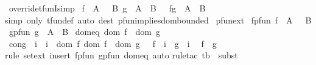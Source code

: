 \begin{isabellebody}
%
\endisadelimproof
\isanewline
{}\isamarkupfalse%
\ override{\isacharunderscore}tfunI{}{\isacharbrackleft}simp{\isacharbrackright}{\isacharcolon}\isanewline
{\isachardoublequoteopen}{\isasymlbrakk}\ f\ {\isacharcolon}\ A\ {\isacharminus}{\isacharbar}{\isacharminus}{\isachargreater}\ \ B{\isacharsemicolon}\ g\ {\isacharcolon}\ A\ {\isacharminus}{\isacharminus}{\isacharminus}{\isachargreater}\ B\ {\isasymrbrakk}\ {\isasymLongrightarrow}\ f{\isacharparenleft}{\isacharplus}{\isacharparenright}g\ {\isacharcolon}\ A\ {\isacharminus}{\isacharminus}{\isacharminus}{\isachargreater}\ B{\isachardoublequoteclose}\isanewline
%
\isadelimproof
%
\endisadelimproof
%
\isatagproof
{}\isamarkupfalse%
{\isacharparenleft}simp\ only{\isacharcolon}\ tfun{\isacharunderscore}def{\isacharcomma}\ auto\ dest{\isacharbang}{\isacharcolon}\ pfun{\isacharunderscore}implies{\isacharunderscore}dom{\isacharunderscore}bounded{\isacharparenright}%
\endisatagproof
{\isafoldproof}%
%
\isadelimproof
\isanewline
%
\endisadelimproof
\isanewline
\isanewline
{}\isamarkupfalse%
\ pfun{\isacharunderscore}ext{\isacharcolon}\isanewline
{}\ f{\isacharunderscore}pfun{\isacharcolon}\ {\isachardoublequoteopen}f\ {\isacharcolon}\ A\ {\isacharminus}{\isacharbar}{\isacharminus}{\isachargreater}\ \ B{\isachardoublequoteclose}\isanewline
{}\ g{\isacharunderscore}pfun{\isacharcolon}\ {\isachardoublequoteopen}g\ {\isacharcolon}\ A\ {\isacharminus}{\isacharbar}{\isacharminus}{\isachargreater}\ B{\isachardoublequoteclose}\isanewline
{}\ dom{\isacharunderscore}eq{\isacharcolon}\ {\isachardoublequoteopen}dom\ f\ {\isacharequal}\ dom\ g{\isachardoublequoteclose}\isanewline
{}\ cong{\isacharcolon}\ {\isachardoublequoteopen}{\isacharbang}{\isacharbang}\ i{\isachardot}\ {\isasymlbrakk}\ i\ {\isacharcolon}\ dom\ f{\isacharsemicolon}\ dom\ f\ {\isacharequal}\ dom\ g\ {\isasymrbrakk}\ {\isasymLongrightarrow}\ f\ {\isacharpercent}{\isacharcircum}\ i\ {\isacharequal}\ g\ {\isacharpercent}{\isacharcircum}\ i{\isachardoublequoteclose}\isanewline
{}\ \ {\isachardoublequoteopen}f\ {\isacharequal}\ g{\isachardoublequoteclose}\isanewline
%
\isadelimproof
%
\endisadelimproof
%
\isatagproof
{}\isamarkupfalse%
{\isacharparenleft}rule\ set{\isacharunderscore}ext{\isacharcomma}\ insert\ f{\isacharunderscore}pfun\ g{\isacharunderscore}pfun\ dom{\isacharunderscore}eq{\isacharcomma}\ auto{\isacharparenright}\isanewline
{}\isamarkupfalse%
{\isacharparenleft}rule{\isacharunderscore}tac\ t{\isacharequal}b\ \ subst{\isacharparenright}\ \isamarkupfalse%

\end{isabellebody}
